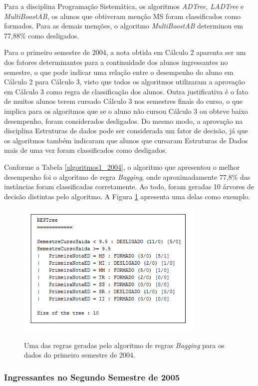 Para a disciplina Programação Sistemática, os algoritmos \textit{ADTree, LADTree} e \textit{MultiBoostAB}, os alunos que obtiveram menção MS foram classificados como formados. Para as demais menções, o algoritmo \textit{MultiBoostAB} determinou em 77,88\% como desligados.

Para o primeiro semestre de 2004, a nota obtida em Cálculo 2 aparenta ser um dos fatores determinantes para a continuidade dos alunos ingressantes no semestre, o que pode indicar uma relação entre o desempenho do aluno em Cálculo 2 para Cálculo 3, visto que todos os algoritmos utilizaram a aprovação em Cálculo 3 como regra de classificação dos alunos. Outra justificativa é o fato de muitos alunos terem cursado Cálculo 3 nos semestres finais do curso, o que implica para os algoritmos que se o aluno não cursou Cálculo 3 ou obteve baixo desempenho, foram considerados desligados. Do mesmo modo, a aprovação na disciplina Estruturas de dados pode ser considerada um fator de decisão, já que os algoritmos também indicaram que alunos que cursaram Estruturas de Dados mais de uma vez foram classificados como desligados.  

Conforme a Tabela \ref{algoritmos1_2004}, o algoritmo que apresentou o melhor desempenho foi o algoritmo de regra \textit{Bagging}, onde aproximadamente 77,8\% das instâncias foram classificadas corretamente. Ao todo, foram geradas 10 árvores de decisão distintas pelo algoritmo. A Figura \ref{regra1_2004} apresenta uma delas como exemplo.

 \begin{figure}[!h]
 	\centering
 	{\includegraphics[width=9cm, height=6.5cm]{images/regra1_2004}}
 	\caption {Uma das regras geradas pelo algoritmo de regras \textit{Bagging} para os dados do primeiro semestre de 2004.}
 	\label{regra1_2004}
 \end{figure}

\subsubsection{Ingressantes no Segundo Semestre de 2005}

